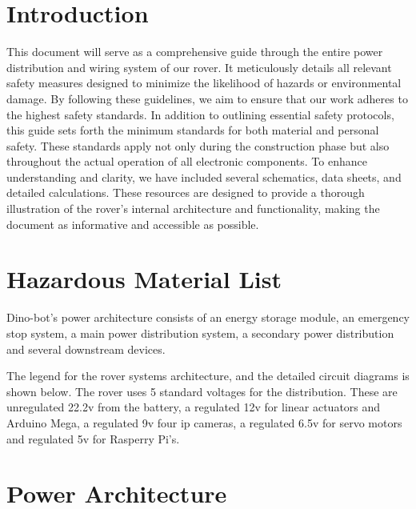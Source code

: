 \section{Introduction}

This document will serve as a comprehensive guide through the entire power distribution and wiring system of our rover. It meticulously details all relevant safety measures designed to minimize the likelihood of hazards or environmental damage. By following these guidelines, we aim to ensure that our work adheres to the highest safety standards.
\newline
In addition to outlining essential safety protocols, this guide sets forth the minimum standards for both material and personal safety. These standards apply not only during the construction phase but also throughout the actual operation of all electronic components. To enhance understanding and clarity, we have included several schematics, data sheets, and detailed calculations. These resources are designed to provide a thorough illustration of the rover's internal architecture and functionality, making the document as informative and accessible as possible.

\section{Hazardous Material List}

Dino-bot's power architecture consists of an energy storage module, an emergency stop system, a main
power distribution system, a secondary power distribution and several
downstream devices.


The legend for the rover systems architecture, and the detailed circuit diagrams is
shown below.
The rover uses 5 standard voltages for the distribution. These are unregulated 22.2v
from the battery, a regulated 12v for linear actuators and Arduino Mega, a regulated 9v
four ip cameras, a regulated 6.5v for servo motors and regulated 5v for Rasperry Pi’s.

\newpage



\newpage
\section{Power Architecture}

